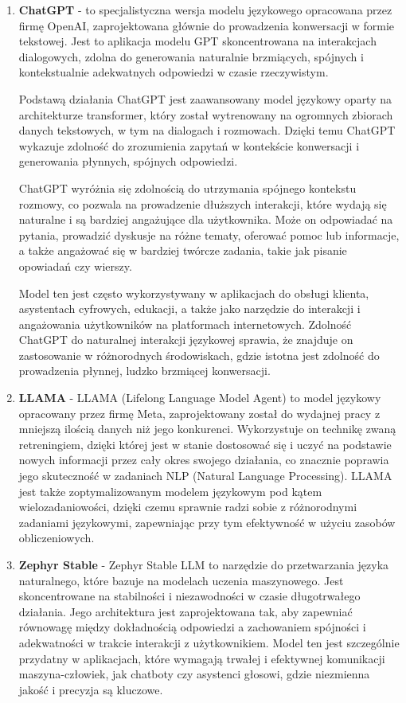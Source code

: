 \begin{enumerate}
 \item {\bf ChatGPT} - to specjalistyczna wersja modelu językowego opracowana przez firmę OpenAI, zaprojektowana głównie do prowadzenia konwersacji w formie tekstowej. Jest to aplikacja modelu GPT skoncentrowana na interakcjach dialogowych, zdolna do generowania naturalnie brzmiących, spójnych i kontekstualnie adekwatnych odpowiedzi w czasie rzeczywistym.

    Podstawą działania ChatGPT jest zaawansowany model językowy oparty na architekturze transformer, który został wytrenowany na ogromnych zbiorach danych tekstowych, w tym na dialogach i rozmowach. Dzięki temu ChatGPT wykazuje zdolność do zrozumienia zapytań w kontekście konwersacji i generowania płynnych, spójnych odpowiedzi.
    
    ChatGPT wyróżnia się zdolnością do utrzymania spójnego kontekstu rozmowy, co pozwala na prowadzenie dłuższych interakcji, które wydają się naturalne i są bardziej angażujące dla użytkownika. Może on odpowiadać na pytania, prowadzić dyskusje na różne tematy, oferować pomoc lub informacje, a także angażować się w bardziej twórcze zadania, takie jak pisanie opowiadań czy wierszy.
    
    Model ten jest często wykorzystywany w aplikacjach do obsługi klienta, asystentach cyfrowych, edukacji, a także jako narzędzie do interakcji i angażowania użytkowników na platformach internetowych. Zdolność ChatGPT do naturalnej interakcji językowej sprawia, że znajduje on zastosowanie w różnorodnych środowiskach, gdzie istotna jest zdolność do prowadzenia płynnej, ludzko brzmiącej konwersacji.
    \\
    \item {\bf LLAMA} - LLAMA (Lifelong Language Model Agent) to model językowy opracowany przez firmę Meta, zaprojektowany został do wydajnej pracy z mniejszą ilością danych niż jego konkurenci. Wykorzystuje on technikę zwaną retreningiem, dzięki której jest w stanie dostosować się i uczyć na podstawie nowych informacji przez cały okres swojego działania, co znacznie poprawia jego skuteczność w zadaniach NLP (Natural Language Processing). LLAMA jest także zoptymalizowanym modelem językowym pod kątem wielozadaniowości, dzięki czemu sprawnie radzi sobie z różnorodnymi zadaniami językowymi, zapewniając przy tym efektywność w użyciu zasobów obliczeniowych.
    \\
    \item {\bf Zephyr Stable} - Zephyr Stable LLM to narzędzie do przetwarzania języka naturalnego, które bazuje na modelach uczenia maszynowego. Jest skoncentrowane na stabilności i niezawodności w czasie długotrwałego działania. Jego architektura jest zaprojektowana tak, aby zapewniać równowagę między dokładnością odpowiedzi a zachowaniem spójności i adekwatności w trakcie interakcji z użytkownikiem. Model ten jest szczególnie przydatny w aplikacjach, które wymagają trwałej i efektywnej komunikacji maszyna-człowiek, jak chatboty czy asystenci głosowi, gdzie niezmienna jakość i precyzja są kluczowe.
    \\

\end{enumerate}

